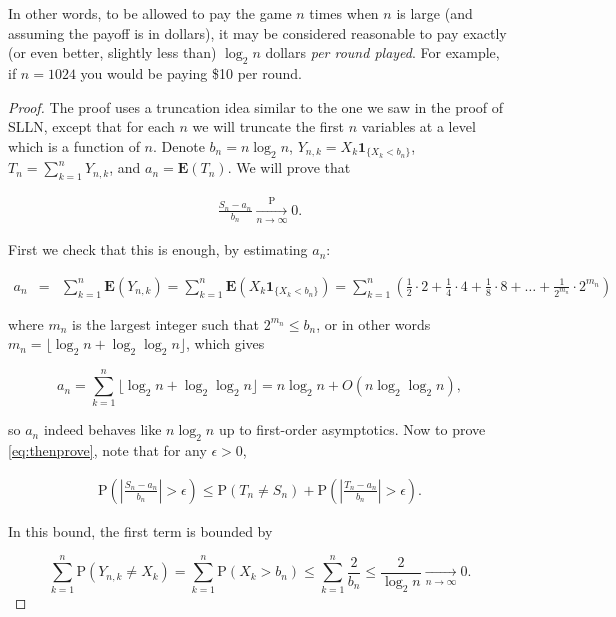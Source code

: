 \noindent In other words, to be allowed to pay the game $n$
times when $n$ is large (and assuming the payoff is
in dollars), it may be considered reasonable to pay
exactly (or even better, slightly less than)
$\log_2 n$ dollars \emph{per round played}. For example,
if $n=1024$ you would be paying \$10 per round.

\begin{proof}
The proof uses a truncation idea similar to the one
we saw in the proof of SLLN, except that for each $n$
we will truncate the first $n$ variables at a level
which is a function of $n$. Denote $b_n = n\log_2 n$,
$Y_{n,k} = X_k \mathbf{1}_{\{X_k<b_n\}}$,
$T_n=\sum_{k=1}^n Y_{n,k}$, and
$a_n = \mathbf{E}(T_n)$. We will prove that

\begin{align*}
\tag{10}\label{eq:thenprove}
\frac{S_n-a_n}{b_n}\xrightarrow[n\to\infty]{\mathrm{P}} 0.
\end{align*}

\noindent First we check that this is enough, by estimating
$a_n$:

\begin{eqnarray*}
a_n &=& \sum_{k=1}^n \mathbf{E}(Y_{n,k}) = \sum_{k=1}^n \mathbf{E}(X_k \mathbf{1}_{\{X_k<b_n\}})
= \sum_{k=1}^n \left(\frac12\cdot 2 + \frac14\cdot 4 + \frac18 \cdot 8 + \ldots + \frac{1}{2^{m_{n}}}\cdot 2^{m_{n}}
\right)
\end{eqnarray*}

\noindent where $m_n$ is the largest integer such that
$2^{m_n} \le b_n$, or in other words
$m_n = \lfloor \log_2 n + \log_2 \log_2 n \rfloor$,
which gives

\[
a_n = \sum_{k=1}^n \lfloor \log_2 n + \log_2 \log_2 n \rfloor = n \log_2 n + O(n \log_2 \log_2 n),
\]

\noindent so $a_n$ indeed behaves like $n\log_2 n$ up to
first-order asymptotics. Now to prove
\eqref{eq:thenprove}, note that for any $\epsilon>0$,

\begin{align*}
\tag{11}\label{eq:lhs}
\mathrm{P}\left( \left|\frac{S_n-a_n}{b_n}\right| > \epsilon\right) \le
\mathrm{P}(T_n\neq S_n) + \mathrm{P}\left( \left|\frac{T_n-a_n}{b_n}\right| > \epsilon\right).
\end{align*}

\noindent In this bound, the first term is bounded by

\[
\sum_{k=1}^n \mathrm{P}(Y_{n,k}\neq X_k) = \sum_{k=1}^n \mathrm{P}(X_k>b_n) \le \sum_{k=1}^n \frac{2}{b_n}
\le \frac{2}{\log_2 n} \xrightarrow[n\to\infty]{} 0.
\]


\end{proof}
